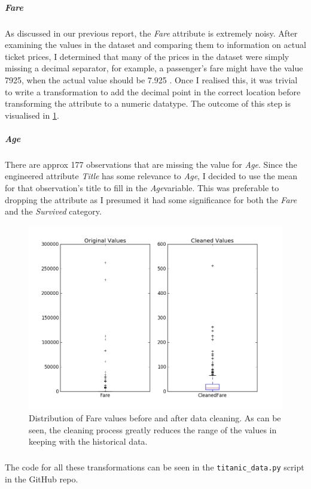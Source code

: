 \documentclass[a4paper]{scrartcl}
\begin{document}
\subparagraph{Fare} 
As discussed in our previous report, the \emph{Fare} attribute is extremely noisy\cite{chegmch16}. After examining the values in the dataset and comparing them to information on actual ticket prices, I determined that many of the prices in the dataset were simply missing a decimal separator, for example, a passenger's fare might have the value 7925, when the actual value should be 7.925 \cite{ref16} \cite{enctit16}. Once I realised this, it was trivial to write a transformation to add the decimal point in the correct location before transforming the attribute to a numeric datatype. The outcome of this step is visualised in \ref{fig:cleaned_fare}.	  

\subparagraph{Age}
There are approx 177 observations that are missing the value for \emph{Age}. Since the engineered attribute \emph{Title} has some relevance to \emph{Age}, I decided to use the mean for that observation's title to fill in the  \emph{Age}variable. This was preferable to dropping the attribute as I presumed it had some significance for both the \emph{Fare} and the \emph{Survived} category.


\begin{figure}
  \includegraphics[scale=.42]{graphs/cleaned_fare.png}
  \centering  
  \caption{Distribution of Fare values before and after data cleaning. As can be seen, the cleaning process greatly reduces the range of the values in keeping with the historical data.}
  \label{fig:cleaned_fare}
\end{figure}

\subparagraph{}
The code for all these transformations can be seen in the \verb+titanic_data.py+ script in the GitHub repo\cite{ronanmch16}.
\end{document}
